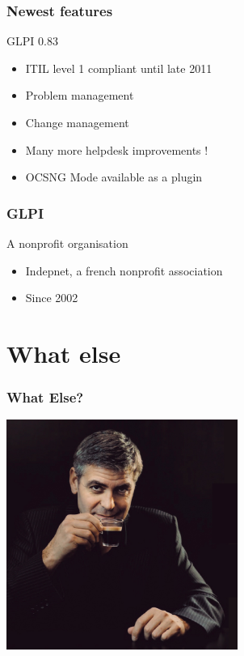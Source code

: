 \documentclass{beamer}
\begin{document}
\begin{frame}

    \frametitle{Newest features}

    \begin{block}{GLPI 0.83}
        \begin{itemize}
            \item ITIL level 1 compliant until late 2011
            \item Problem management
            \item Change management
            \item Many more helpdesk improvements !
            \item OCSNG Mode available as a plugin
        \end{itemize}
    \end{block}

\end{frame}

\begin{frame}

    \frametitle{GLPI}

    \begin{block}{A nonprofit organisation}
        \begin{itemize}
            \item Indepnet, a french nonprofit association
            \item Since 2002
        \end{itemize}
    \end{block}

\end{frame}



\section{What else}

\begin{frame}

    \frametitle{What Else?}


\includegraphics[height=7.5cm]{./pics/whatelse.jpg}

\end{frame}
\end{document}
